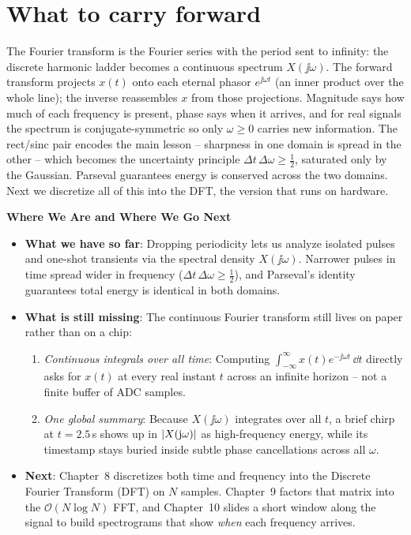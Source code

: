\section{What to carry forward}
\label{ch07:recap}

\begin{recoverybox}
The Fourier transform is the Fourier series with the period sent to infinity: the
discrete harmonic ladder becomes a continuous spectrum $X(\jj\omega)$. The forward
transform projects $x(t)$ onto each eternal phasor $e^{\jj\omega t}$ (an inner product
over the whole line); the inverse reassembles $x$ from those projections. Magnitude says
how much of each frequency is present, phase says when it arrives, and for real signals
the spectrum is conjugate-symmetric so only $\omega\ge 0$ carries new information. The
rect/sinc pair encodes the main lesson -- sharpness in one domain is spread in the
other -- which becomes the uncertainty principle $\Delta t\,\Delta\omega\ge\tfrac12$,
saturated only by the Gaussian. Parseval guarantees energy is conserved across the two
domains. Next we discretize all of this into the DFT, the version that runs on
hardware.
\end{recoverybox}

\begin{connectionbox}
\textbf{Where We Are and Where We Go Next}
\begin{itemize}
  \item \textbf{What we have so far}: Dropping periodicity lets us analyze isolated pulses and
  one-shot transients via the spectral density $X(\jj\omega)$. Narrower pulses in time spread wider
  in frequency ($\Delta t\,\Delta\omega \ge \tfrac12$), and Parseval's identity guarantees total
  energy is identical in both domains.
  \item \textbf{What is still missing}: The continuous Fourier transform still lives on paper rather
  than on a chip:
  \begin{enumerate}
    \item \emph{Continuous integrals over all time}: Computing $\int_{-\infty}^\infty x(t)e^{-\jj\omega t}\,\dd t$
    directly asks for $x(t)$ at every real instant $t$ across an infinite horizon -- not a finite
    buffer of ADC samples.
    \item \emph{One global summary}: Because $X(\jj\omega)$ integrates over all $t$, a brief chirp at
    $t = 2.5\,$s shows up in $\lvert X(\mathrm{j}\omega)\rvert$ as high-frequency energy, while its timestamp stays
    buried inside subtle phase cancellations across all $\omega$.
  \end{enumerate}
  \item \textbf{Next}: Chapter~8 discretizes both time and frequency into the Discrete Fourier
  Transform (DFT) on $N$ samples. Chapter~9 factors that matrix into the $\mathcal{O}(N\log N)$ FFT,
  and Chapter~10 slides a short window along the signal to build spectrograms that show \emph{when}
  each frequency arrives.
\end{itemize}
\end{connectionbox}

